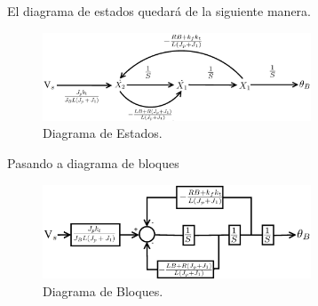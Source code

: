 \documentclass[a4paper]{IEEEtran} %
\begin{document}
El diagrama de estados quedará de la siguiente manera. 
\begin{figure}[h]
    \centering
        \includegraphics[width=8cm]{images/estados.eps}
        \caption{Diagrama de Estados.}
        \label{fig:states}
\end{figure}

Pasando a diagrama de bloques
\begin{figure}[h]
    \centering
        \includegraphics[width=8cm]{images/bloques.eps}
        \caption{Diagrama de Bloques.}
        \label{fig:bloques}
\end{figure}
\vspace{100mm}


\end{document}
